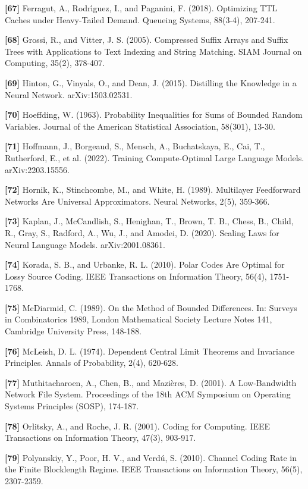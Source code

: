 \documentclass[
]{article}
\begin{document}
\textbf{{[}67{]}} Ferragut, A., Rodr{\'\i}guez, I., and Paganini, F.
(2018). Optimizing TTL Caches under Heavy-Tailed Demand. Queueing
Systems, 88(3-4), 207-241.

\textbf{{[}68{]}} Grossi, R., and Vitter, J. S. (2005). Compressed
Suffix Arrays and Suffix Trees with Applications to Text Indexing and
String Matching. SIAM Journal on Computing, 35(2), 378-407.

\textbf{{[}69{]}} Hinton, G., Vinyals, O., and Dean, J. (2015).
Distilling the Knowledge in a Neural Network. arXiv:1503.02531.

\textbf{{[}70{]}} Hoeffding, W. (1963). Probability Inequalities for
Sums of Bounded Random Variables. Journal of the American Statistical
Association, 58(301), 13-30.

\textbf{{[}71{]}} Hoffmann, J., Borgeaud, S., Mensch, A., Buchatskaya,
E., Cai, T., Rutherford, E., et al. (2022). Training Compute-Optimal
Large Language Models. arXiv:2203.15556.

\textbf{{[}72{]}} Hornik, K., Stinchcombe, M., and White, H. (1989).
Multilayer Feedforward Networks Are Universal Approximators. Neural
Networks, 2(5), 359-366.

\textbf{{[}73{]}} Kaplan, J., McCandlish, S., Henighan, T., Brown,
T. B., Chess, B., Child, R., Gray, S., Radford, A., Wu, J., and
Amodei, D. (2020). Scaling Laws for Neural Language Models.
arXiv:2001.08361.

\textbf{{[}74{]}} Korada, S. B., and Urbanke, R. L. (2010). Polar
Codes Are Optimal for Lossy Source Coding. IEEE Transactions on
Information Theory, 56(4), 1751-1768.

\textbf{{[}75{]}} McDiarmid, C. (1989). On the Method of Bounded
Differences. In: Surveys in Combinatorics 1989, London Mathematical
Society Lecture Notes 141, Cambridge University Press, 148-188.

\textbf{{[}76{]}} McLeish, D. L. (1974). Dependent Central Limit
Theorems and Invariance Principles. Annals of Probability, 2(4),
620-628.

\textbf{{[}77{]}} Muthitacharoen, A., Chen, B., and Mazi\`eres, D.
(2001). A Low-Bandwidth Network File System. Proceedings of the 18th
ACM Symposium on Operating Systems Principles (SOSP), 174-187.

\textbf{{[}78{]}} Orlitsky, A., and Roche, J. R. (2001). Coding for
Computing. IEEE Transactions on Information Theory, 47(3), 903-917.

\textbf{{[}79{]}} Polyanskiy, Y., Poor, H. V., and Verd\'u, S. (2010).
Channel Coding Rate in the Finite Blocklength Regime. IEEE Transactions
on Information Theory, 56(5), 2307-2359.
\end{document}
